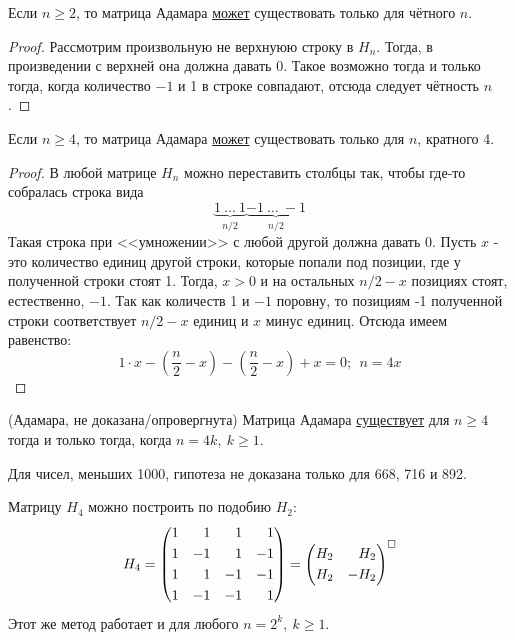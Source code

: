 \begin{proposition}
	Если $n \ge 2$, то матрица Адамара \underline{может} существовать только для чётного $n$.
\end{proposition}

\begin{proof}
	Рассмотрим произвольную не верхнуюю строку в $H_n$. Тогда, в произведении с верхней она должна давать 0. Такое возможно тогда и только тогда, когда количество $-1$ и 1 в строке совпадают, отсюда следует чётность $n$.
\end{proof}

\begin{proposition}
	Если $n \ge 4$, то матрица Адамара \underline{может} существовать только для $n$, кратного 4.
\end{proposition}

\begin{proof}
	В любой матрице $H_n$ можно переставить столбцы так, чтобы где-то собралась строка вида
	\[
		\underbrace{1\ \ldots\ 1}_{n/2} \underbrace{-1\ \ldots\ -1}_{n/2}
	\]
	Такая строка при <<умножении>> с любой другой должна давать 0. Пусть $x$ - это количество единиц другой строки, которые попали под позиции, где у полученной строки стоят 1. Тогда, $x > 0$ и на остальных $n/2 - x$ позициях стоят, естественно, $-1$. Так как количеств 1 и $-1$ поровну, то позициям -1 полученной строки соответствует $n/2 - x$ единиц и $x$ минус единиц. Отсюда имеем равенство:
	\[
		1 \cdot x - \left(\frac{n}{2} - x\right) - \left(\frac{n}{2} - x\right) + x = 0;\ \ n = 4x
	\]
\end{proof}

\begin{hypothesis} (Адамара, не доказана/опровергнута)
	Матрица Адамара \underline{существует} для $n \ge 4$ тогда и только тогда, когда $n = 4k,\ k \ge 1$.
\end{hypothesis}

\begin{note}
	 Для чисел, меньших 1000, гипотеза не доказана только для 668, 716 и 892.
\end{note}

\begin{example}
	Матрицу $H_4$ можно построить по подобию $H_2$:
	\[
		H_4 = \left(\begin{aligned}
			&1 &1& &1& &1 \\
			&1 &-1& &1& &-1 \\
			&1 &1& &-1& &-1 \\
			&1 &-1& &-1& &1
		\end{aligned}\right) = \left(\begin{aligned}
			&H_2 & H_2 \\
			&H_2 & -H_2
		\end{aligned}\right)^{\square}
	\]
	Этот же метод работает и для любого $n = 2^k,\ k \ge 1$.
\end{example}

